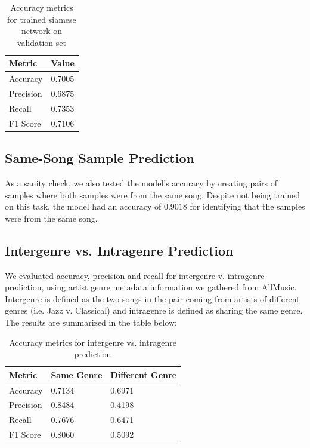 \begin{table}[H]
\centering
\caption{Accuracy metrics for trained siamese network on validation set}
\label{my-label}
\begin{tabular}{|l|l|}
\hline
Metric    & Value  \\ \hline
Accuracy  & 0.7005 \\ \hline
Precision & 0.6875 \\ \hline
Recall    & 0.7353 \\ \hline
F1 Score  & 0.7106 \\ \hline
\end{tabular}
\end{table}


\subsection{Same-Song Sample Prediction}
As a sanity check, we also tested the model's accuracy by creating pairs of samples where both samples were from the same song. Despite not being trained on this task, the model had an accuracy of $0.9018$ for identifying that the samples were from the same song.

\subsection{Intergenre vs. Intragenre Prediction}
We evaluated accuracy, precision and recall for intergenre v. intragenre prediction, using artist genre metadata information we gathered from AllMusic. Intergenre is defined as the two songs in the pair coming from artists of different genres (i.e. Jazz v. Classical) and intragenre is defined as sharing the same genre. The results are summarized in the table below:

\begin{table}[H]
\centering
\caption{Accuracy metrics for intergenre vs. intragenre prediction}
\label{my-label}
\begin{tabular}{|l|l|l|}
\hline
Metric    & Same Genre & Different Genre \\ \hline
Accuracy  & 0.7134     & 0.6971          \\ \hline
Precision & 0.8484     & 0.4198          \\ \hline
Recall    & 0.7676     & 0.6471          \\ \hline
F1 Score  & 0.8060     & 0.5092          \\ \hline
\end{tabular}
\end{table}

